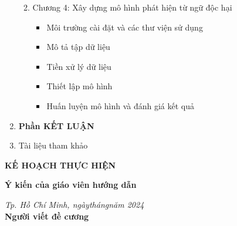 \begin{enumerate}[label=\textbf{\arabic*.}]
\begin{enumerate}
\begin{itemize}
                    \end{itemize}
              \item Chương 4: Xây dựng mô hình phát hiện từ ngữ độc hại
                    \begin{itemize}
                        \item Môi trường cài đặt và các thư viện sử dụng
                        \item Mô tả tập dữ liệu
                        \item Tiền xử lý dữ liệu
                        \item Thiết lập mô hình
                        \item Huấn luyện mô hình và đánh giá kết quả
                    \end{itemize}
          \end{enumerate}
    \item \textbf{Phần KẾT LUẬN}
    \item Tài liệu tham khảo
          \begin{enumerate}[label={[\arabic*]}]
              \item \dots
              \item \dots
          \end{enumerate}
\end{enumerate}

\textbf{KẾ HOẠCH THỰC HIỆN}


\noindent\begin{minipage}[t]{0.42\textwidth}
    \centering
    \fontsize{11pt}{16.5pt}
    \textbf{Ý kiến của giáo viên hướng dẫn}\\
\end{minipage}
\begin{minipage}[t]{0.57\textwidth}
    \centering
    \fontsize{11pt}{16.5pt}
    \textit{Tp. Hồ Chí Minh, ngày\qquad tháng\qquad năm 2024}\\
    \textbf{Người viết đề cương}\\
\end{minipage}
\restoregeometry